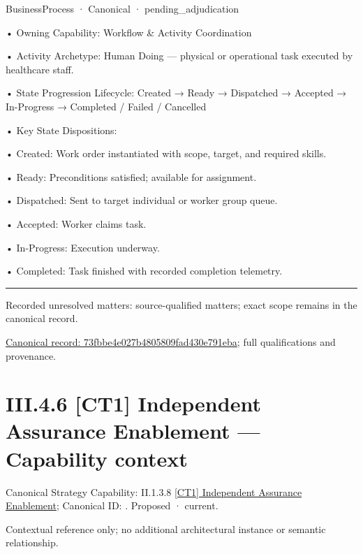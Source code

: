 \label{element:73fbbe4e027b4805809fad430e791eba}
{\small BusinessProcess · Canonical · pending\_adjudication}\par

•
Owning Capability: Workflow \& Activity Coordination



•
Activity Archetype: Human Doing — physical or operational task executed by healthcare staff.



•
State Progression Lifecycle: Created → Ready → Dispatched → Accepted → In-Progress → Completed / Failed / Cancelled



•
Key State Dispositions:



•
Created: Work order instantiated with scope, target, and required skills.



•
Ready: Preconditions satisfied; available for assignment.



•
Dispatched: Sent to target individual or worker group queue.



•
Accepted: Worker claims task.



•
In-Progress: Execution underway.



•
Completed: Task finished with recorded completion telemetry.



\medskip\hrule\medskip

{\small Recorded unresolved matters: source-qualified matters; exact scope remains in the canonical record.}\par
{\footnotesize \href{../../../../continuum/business/business-process/73fbbe4e027b4805809fad430e791eba.md}{Canonical record: 73fbbe4e027b4805809fad430e791eba}; full qualifications and provenance.}\par
\section*{III.4.6 [CT1] Independent Assurance Enablement — Capability context}
\label{navigation:III.4.6}

{\small Canonical Strategy Capability: II.1.3.8 \hyperref[element:616682b612d244429e656b040e002d56]{[CT1] Independent Assurance Enablement}; Canonical ID: \texttt{}. Proposed · current.}\par
Contextual reference only; no additional architectural instance or semantic relationship.\par
